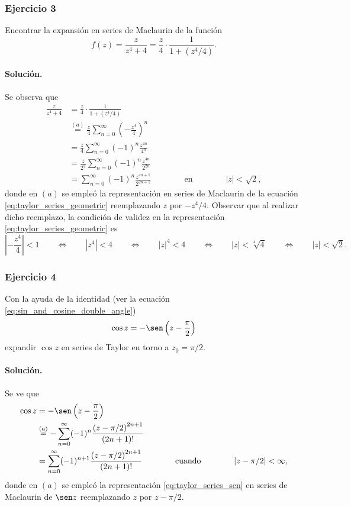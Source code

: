 \documentclass[a4paper]{report}
\begin{document}
\subsubsection*{Ejercicio 3}

Encontrar la expansión en series de Maclaurin de la función
\[
 f(z)=\frac{z}{z^4+4}=\frac{z}{4}\cdot\frac{1}{1+(z^4/4)}.
\]

\paragraph{Solución.} Se observa que 
\begin{align*}
 \frac{z}{z^4+4}&=\frac{z}{4}\cdot\frac{1}{1+(z^4/4)}\\
 &\overset{(a)}{=}\frac{z}{4}\sum_{n=0}^\infty\left(-\frac{z^4}{4}\right)^n\\
 &=\frac{z}{4}\sum_{n=0}^\infty(-1)^n\frac{z^{4n}}{4^n}\\
 &=\frac{z}{2^2}\sum_{n=0}^\infty(-1)^n\frac{z^{4n}}{2^{2n}}\\
 &=\sum_{n=0}^\infty(-1)^n\frac{z^{4n+1}}{2^{2n+2}}
 \qquad\qquad\textrm{en}\qquad\qquad
  |z|<\sqrt{2},
\end{align*}
donde en \((a)\) se empleó la representación en series de Maclaurin de la ecuación \ref{eq:taylor_series_geometric} reemplazando \(z\) por \(-z^4/4\). Observar que al realizar dicho reemplazo, la condición de validez en la representación \ref{eq:taylor_series_geometric} es
\[
 \left|-\frac{z^4}{4}\right|<1
 \qquad\Leftrightarrow\qquad 
 |z^4|<4
 \qquad\Leftrightarrow\qquad 
 |z|^4<4
 \qquad\Leftrightarrow\qquad 
 |z|<\sqrt[4]{4}
 \qquad\Leftrightarrow\qquad 
 |z|<\sqrt{2}.
\]

\subsubsection*{Ejercicio 4}

Con la ayuda de la identidad (ver la ecuación \ref{eq:sin_and_cosine_double_angle})
\[
 \cos z=-\sen\left(z-\dfrac{\pi}{2}\right)
\]
expandir \(\cos z\) en series de Taylor en torno a \(z_0=\pi/2\).

\paragraph{Solución.} Se ve que 
\begin{align*}
 \cos z&=-\sen\left(z-\dfrac{\pi}{2}\right)\\
  &\overset{(a)}{=}-\sum_{n=0}^\infty(-1)^n\frac{\left(z-\pi/2\right)^{2n+1}}{(2n+1)!}\\
  &=\sum_{n=0}^\infty(-1)^{n+1}\frac{\left(z-\pi/2\right)^{2n+1}}{(2n+1)!}
  \qquad\qquad\textrm{cuando}\qquad\qquad
 |z-\pi/2|<\infty,
\end{align*}
donde en \((a)\) se empleó la representación \ref{eq:taylor_series_sen} en series de Maclaurin de \(\sen z\) reemplazando \(z\) por \(z-\pi/2\). 
\end{document}
